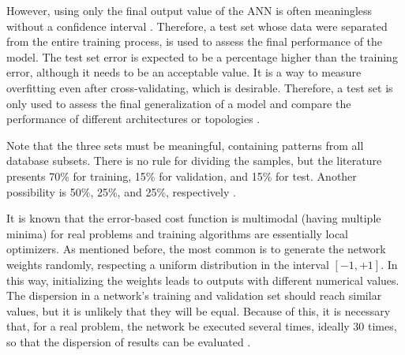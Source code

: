 \documentclass[ruled,graybox]{svmult}
\begin{document}

However, using only the final output value of the ANN is often meaningless without a confidence interval \cite{Kohavi1995}. Therefore, a test set whose data were separated from the entire training process, is used to assess the final performance of the model. The test set error is expected to be a percentage higher than the training error, although it needs to be an acceptable value. It is a way to measure overfitting even after cross-validating, which is desirable. Therefore, a test set is only used to assess the final generalization of a model and compare the performance of different architectures or topologies \cite{Ripley2005}.


Note that the three sets must be meaningful, containing patterns from all database subsets. There is no rule for dividing the samples, but the literature presents 70\% for training, 15\% for validation, and 15\% for test. Another possibility is 50\%, 25\%, and 25\%, respectively \cite{haykin}.

It is known that the error-based cost function is multimodal (having multiple minima) for real problems and training algorithms are essentially local optimizers. As mentioned before, the most common is to generate the network weights randomly, respecting a uniform distribution in the interval $[-1,+1]$. In this way, initializing the weights leads to outputs with different numerical values. The dispersion in a network's training and validation set should reach similar values, but it is unlikely that they will be equal. Because of this, it is necessary that, for a real problem, the network %
be executed several times, ideally 30 times, so that the dispersion of results can be evaluated \cite{demvsar2006statistical}. 
\end{document}
